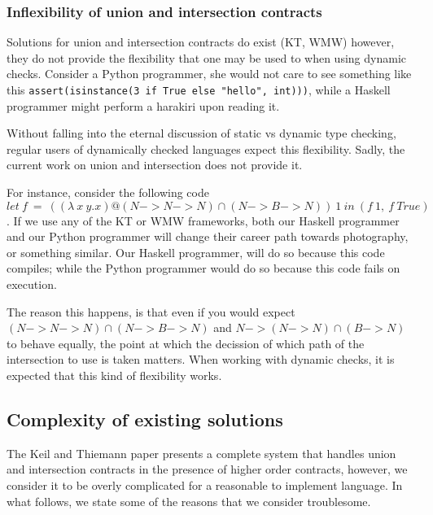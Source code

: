 \subsubsection*{Inflexibility of union and intersection contracts}

Solutions for union and intersection contracts do exist (KT, WMW) however,
they do not provide the flexibility that one may be used to when using dynamic checks.
Consider a Python programmer, she would not care to see something like this
\texttt{assert(isinstance(3 if True else "hello", int)))}, while a Haskell programmer
might perform a harakiri upon reading it.

Without falling into the eternal discussion of static vs dynamic type checking,
regular users of dynamically checked languages expect this flexibility.
Sadly, the current work on union and intersection does not provide it.

For instance, consider the following code
$let~f~=~((\lambda~x~y.x)@(N -> N -> N) \cap (N -> B -> N))~1~in~(f~1,~f~True)$.
If we use any of the KT or WMW frameworks, both our Haskell programmer and our
Python programmer will change their career path towards photography, or something
similar.
Our Haskell programmer, will do so because this code compiles;
while the Python programmer would do so because this code fails on execution.

The reason this happens, is that even if you would expect
$(N -> N -> N) \cap (N -> B -> N)$
and $N -> (N -> N) \cap (B -> N)$ to behave equally, the point at which
the decission of which path of the intersection to use is taken
matters.
When working with dynamic checks, it is expected that this kind of
flexibility works.



\subsection{Complexity of existing solutions}

The Keil and Thiemann paper presents a complete system that handles union and intersection
contracts in the presence of higher order contracts, however, we consider it to be overly
complicated for a reasonable to implement language.
In what follows, we state some of the reasons that we consider troublesome.

